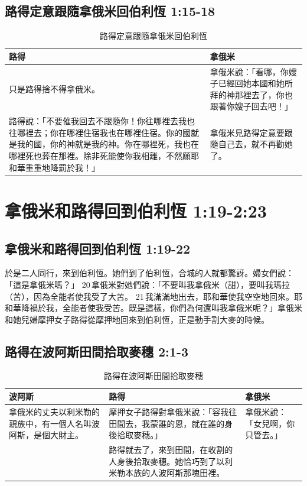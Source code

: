 \subsection{路得定意跟隨拿俄米回伯利恆 1:15-18}
\begin{table}[H]
\centering
\begin{tabular}{p{}|p{5cm}}\hline
路得&拿俄米\\\hline
只是路得捨不得拿俄米。
&拿俄米說：「看哪，你嫂子已經回她本國和她所拜的神那裡去了，你也跟著你嫂子回去吧！」 \\\hline
路得說：「不要催我回去不跟隨你！你往哪裡去我也往哪裡去；你在哪裡住宿我也在哪裡住宿。你的國就是我的國，你的神就是我的神。你在哪裡死，我也在哪裡死也葬在那裡。除非死能使你我相離，不然願耶和華重重地降罰於我！」 &拿俄米見路得定意要跟隨自己去，就不再勸她了。\\\hline
\end{tabular}
\caption{路得定意跟隨拿俄米回伯利恆}
\end{table} 



\section{拿俄米和路得回到伯利恆 1:19-2:23}
\subsection{拿俄米和路得回到伯利恆 1:19-22}
於是二人同行，來到伯利恆。她們到了伯利恆，合城的人就都驚訝。婦女們說：「這是拿俄米嗎？」 20 拿俄米對她們說：「不要叫我拿俄米（甜），要叫我瑪拉（苦），因為全能者使我受了大苦。 21 我滿滿地出去，耶和華使我空空地回來。耶和華降禍於我，全能者使我受苦。既是這樣，你們為何還叫我拿俄米呢？」拿俄米和她兒婦摩押女子路得從摩押地回來到伯利恆，正是動手割大麥的時候。

\subsection{路得在波阿斯田間拾取麥穗 2:1-3}
\begin{table}[H]
\centering
\begin{tabular}{p{5.5cm}|p{8.5cm}|p{3cm}}\hline
波阿斯&路得&拿俄米\\\hline
拿俄米的丈夫以利米勒的親族中，有一個人名叫波阿斯，是個大財主。 
&摩押女子路得對拿俄米說：「容我往田間去，我蒙誰的恩，就在誰的身後拾取麥穗。」 &拿俄米說：「女兒啊，你只管去。」\\\hline
&路得就去了，來到田間，在收割的人身後拾取麥穗。她恰巧到了以利米勒本族的人波阿斯那塊田裡。&\\\hline
\end{tabular}
\caption{路得在波阿斯田間拾取麥穗 }
\end{table} 


